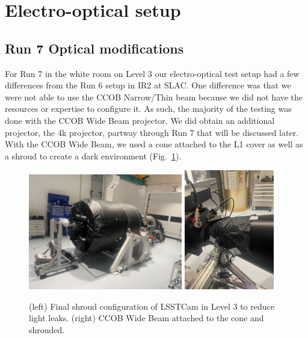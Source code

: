 


\section{Electro-optical setup}\label{electro-optical-setup}

\subsection{Run 7 Optical modifications}\label{run-7-optical-modifications}

For Run 7 in the white room on Level 3 our electro-optical test setup had a few differences from the Run 6 setup in IR2 at SLAC. One difference was that we were not able to use the CCOB Narrow/Thin beam because we did not have the resources or expertise to configure it. As
such, the majority of the testing was done with the CCOB Wide Beam
projector. We did obtain an additional projector, the 4k projector, partway through Run 7 that will be discussed later. With the CCOB Wide Beam,
we used a cone attached to the L1 cover as well as a shroud to create a
dark environment (Fig.~\ref{fig:LSSTCam_config}).

\begin{figure}[htbp]
\centering

    \includegraphics[width=0.6\textwidth]{sections/figures/Camera_Shroud.jpg} 
    \includegraphics[width=0.35\textwidth]{sections/figures/CCOB_Wide_Shroud.jpg} \\

\caption{(left) Final shroud configuration of LSSTCam in Level 3 to reduce light leaks. (right) CCOB Wide Beam attached to the cone and shrouded.}
\label{fig:LSSTCam_config}
\end{figure}

